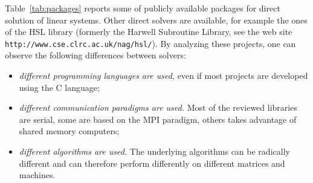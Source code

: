 \documentclass[acmtocl]{acmtrans2m}
\begin{document}
Table~\ref{tab:packages} reports some of publicly available packages for
direct solution of linear systems. Other direct solvers are available, for
example the ones of the HSL library
(formerly the Harwell Subroutine Library, see the web site
 \verb!http://www.cse.clrc.ac.uk/nag/hsl/!).
By analyzing these projects, one can observe the
following differences between solvers: 
\begin{itemize}
\item {\sl different programming languages are used,} even if most projects are
developed using the C language;

\item {\sl different communication paradigms are used.} 
 Most of the reviewed libraries are serial, some are based on the MPI
 paradigm, others takes advantage of shared memory computers;

\item {\sl different algorithms are used.} The underlying algorithms can be radically
different and can therefore perform differently on different matrices and
machines.

\end{itemize}
\end{document}
